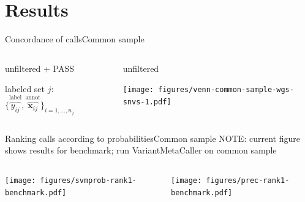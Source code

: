 \documentclass{beamer}
\begin{document}
\section{Results}

\begin{frame}{Concordance of calls}{Common sample}
\begin{columns}[t]
\begin{column}{0.5\textwidth}
unfiltered + PASS

labeled set \(j\): \(\{\overbrace{y_{ij}}^\text{label},
\overbrace{\mathbf{x}_{ij}}^\text{annot}\}_{i=1,...,n_j}\)
\end{column}

\begin{column}{0.5\textwidth}
unfiltered

\texttt{[image: figures/venn-common-sample-wgs-snvs-1.pdf]}
\end{column}
\end{columns}
\end{frame}

\begin{frame}{Ranking calls according to probabilities}{Common sample}
NOTE: current figure shows results for benchmark; run VariantMetaCaller on
common sample
\begin{columns}[t]
\begin{column}{0.5\textwidth}

\texttt{[image: figures/svmprob-rank1-benchmark.pdf]}
\end{column}

\begin{column}{0.5\textwidth}

\texttt{[image: figures/prec-rank1-benchmark.pdf]}
\end{column}
\end{columns}
\end{frame}
\end{document}
